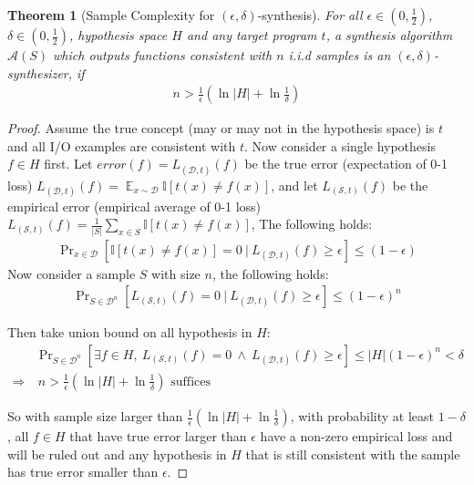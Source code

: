 \documentclass[11pt]{extarticle}
\newtheorem{theorem}{Theorem}[section]
\newcommand{\synthalgo}{\mathcal{A}(S)}
\newcommand{\prb}{\mathop{\text{Pr}}}
\begin{document}
\begin{theorem}[Sample Complexity for $(\epsilon, \delta)$-synthesis]
  \label{thm:static-union-bound}
For all $\epsilon \in (0,\frac{1}{2})$, $\delta\in
(0,\frac{1}{2})$, hypothesis space $H$ and any target program $t$, a synthesis algorithm $\synthalgo$ which outputs functions consistent with $n$ i.i.d samples is an $(\epsilon, \delta)$-synthesizer, if 
\begin{align*}
  n > \frac{1}{\epsilon}(\ln |H| + \ln
  \frac{1}{\delta})
\end{align*}

\end{theorem}

\begin{proof}
Assume the true concept (may or may not in the hypothesis space) is $t$ and all I/O examples are consistent with $t$.
Now consider a single hypothesis $f\in H$ first.
Let $error(f) = L_{(\mathcal{D},t)}(f)$ be the true error (expectation of 0-1 loss) $L_{(\mathcal{D},t)}(f)=\mathop{\mathbb{E}}_{x\sim\mathcal{D}}\mathbb{I}[t(x)\neq f(x)]$,
and let $L_{(\mathcal{S},t)}(f)$ be the empirical error (empirical average of 0-1 loss) $L_{(\mathcal{S},t)}(f)=\frac{1}{|S|}\sum_{x\in S}\mathbb{I}[t(x)\neq f(x)]$,
The following holds:
\begin{align*}
\prb_{x\in \mathcal{D}} [\mathbb{I}[t(x)\neq f(x)] = 0 ~|~ L_{(\mathcal{D},t)}(f) \geq \epsilon] \leq (1-\epsilon)
\end{align*}
Now consider a sample $S$ with size $n$, the following holds:
\begin{align*}
\prb_{S\in \mathcal{D}^{n}} [L_{(\mathcal{S},t)}(f) = 0 ~|~ L_{(\mathcal{D},t)}(f) \geq \epsilon] \leq (1-\epsilon)^{n}
\end{align*}

Then take union bound on all hypothesis in $H$:
\begin{align*}
    &\prb_{S\in \mathcal{D}^{n}} [\exists f\in H, ~L_{(\mathcal{S},t)}(f) = 0 ~\land~ L_{(\mathcal{D},t)}(f) \geq \epsilon] \leq |H|(1-\epsilon)^{n} < \delta\\
    \Rightarrow & ~n > \frac{1}{\epsilon}(\ln |H| + \ln
    \frac{1}{\delta}) \text{ suffices}
\end{align*}

So with sample size larger than $\frac{1}{\epsilon}(\ln |H| + \ln
\frac{1}{\delta})$, with probability at least $1-\delta$, all $f\in H$ that 
have true error larger than $\epsilon$ have a non-zero empirical loss and will be ruled out
and any hypothesis in $H$ that is still consistent with the sample has 
true error smaller than $\epsilon$.

\end{proof}
\end{document}
